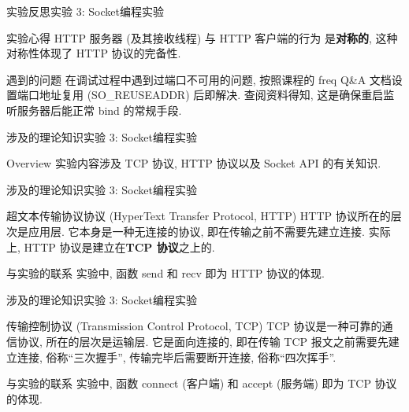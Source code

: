 \documentclass{beamer}
\begin{document}
\begin{frame}{实验反思}{实验 3: Socket编程实验}
    \begin{block}{实验心得}
        HTTP 服务器 (及其接收线程) 与 HTTP 客户端的行为
        是\textbf{对称的}, 这种对称性体现了 HTTP 协议的完备性.
    \end{block}

    \begin{block}{遇到的问题}
        在调试过程中遇到过端口不可用的问题, 按照课程的
        freq Q\&A 文档设置端口地址复用 (SO\_REUSEADDR)
        后即解决. 查阅资料得知, 这是确保重启监听服务器后能正常
        bind 的常规手段.
    \end{block}
\end{frame}

\begin{frame}{涉及的理论知识}{实验 3: Socket编程实验}
    \begin{alertblock}{Overview}
        实验内容涉及 TCP 协议, HTTP 协议以及 Socket API 的有关知识.
    \end{alertblock}
\end{frame}
\begin{frame}{涉及的理论知识}{实验 3: Socket编程实验}
    \begin{block}{超文本传输协议协议 (HyperText Transfer Protocol, HTTP)}
        HTTP 协议所在的层次是应用层. 它本身是一种无连接的协议,
        即在传输之前不需要先建立连接.
        实际上, HTTP 协议是建立在\textbf{TCP 协议}之上的.
    \end{block}
    \begin{exampleblock}{与实验的联系}
        实验中, 函数 send 和 recv 即为 HTTP 协议的体现.
    \end{exampleblock}
\end{frame}
\begin{frame}{涉及的理论知识}{实验 3: Socket编程实验}
    \begin{block}{传输控制协议 (Transmission Control Protocol, TCP)}
        TCP 协议是一种可靠的通信协议, 所在的层次是运输层.
        它是面向连接的, 即在传输 TCP 报文之前需要先建立连接,
        俗称“三次握手”, 传输完毕后需要断开连接, 俗称“四次挥手”.
    \end{block}
    \begin{exampleblock}{与实验的联系}
        实验中, 函数 connect (客户端) 和 accept (服务端) 即为 TCP 协议的体现.
    \end{exampleblock}
\end{frame}
\end{document}
